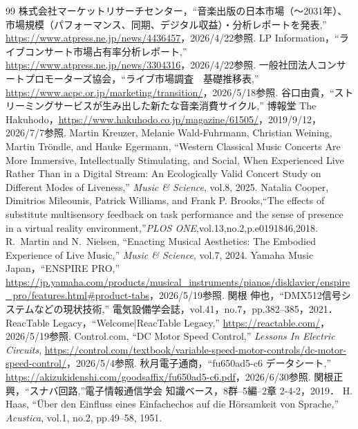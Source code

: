 \begin{thebibliography}{99}
     株式会社マーケットリサーチセンター，``音楽出版の日本市場（～2031年）、市場規模（パフォーマンス、同期、デジタル収益）・分析レポートを発表,'' \url{https://www.atpress.ne.jp/news/4436457}，2026/4/22参照.
     LP Information，``ライブコンサート市場占有率分析レポート,'' \url{https://www.atpress.ne.jp/news/3304316}，2026/4/22参照.
     一般社団法人コンサートプロモーターズ協会，``ライブ市場調査　基礎推移表,'' \url{https://www.acpc.or.jp/marketing/transition/}，2026/5/18参照.
     谷口由貴，``ストリーミングサービスが生み出した新たな音楽消費サイクル,'' 博報堂 The Hakuhodo，\url{https://www.hakuhodo.co.jp/magazine/61505/}，2019/9/12，2026/7/7参照.
     Martin Kreuzer, Melanie Wald-Fuhrmann, Christian Weining, Martin Tr\"{o}ndle, and Hauke Egermann, ``Western Classical Music Concerts Are More Immersive, Intellectually Stimulating, and Social, When Experienced Live Rather Than in a Digital Stream: An Ecologically Valid Concert Study on Different Modes of Liveness,'' \textit{Music \& Science}, vol.8, 2025.
     Natalia Cooper, Dimitrios Mileounis, Patrick Williams, and Frank P. Brooks,``The effects of substitute multisensory feedback on task performance and the sense of presence in a virtual reality environment,''\textit{PLOS ONE},vol.13,no.2,p.e0191846,2018.
     R.~Martin and N.~Nielsen, ``Enacting Musical Aesthetics: The Embodied Experience of Live Music,'' \textit{Music \& Science}, vol.7, 2024.
     Yamaha Music Japan，``ENSPIRE PRO,'' \url{https://jp.yamaha.com/products/musical_instruments/pianos/disklavier/enspire_pro/features.html#product-tabs}，2026/5/19参照.
     関根 伸也，``DMX512信号システムなどの現状技術,'' 電気設備学会誌，vol.41，no.7，pp.382--385，2021．
     ReacTable Legacy，``Welcome|ReacTable Legacy,'' \url{https://reactable.com/}，2026/5/19参照.
     Control.com, ``DC Motor Speed Control,'' \textit{Lessons In Electric Circuits}, \url{https://control.com/textbook/variable-speed-motor-controls/dc-motor-speed-control/}，2026/5/4参照.
     秋月電子通商，``fu650ad5-c6 データシート,'' \url{https://akizukidenshi.com/goodsaffix/fu650ad5-c6.pdf}，2026/6/30参照.
    関根正興，``スナバ回路,''電子情報通信学会 知識ベース，8群--5編--2章 2-4-2，2019．
     H. Haas, ``\"{U}ber den Einfluss eines Einfachechos auf die H\"{o}rsamkeit von Sprache,'' \textit{Acustica}, vol.1, no.2, pp.49--58, 1951.

\end{thebibliography}
